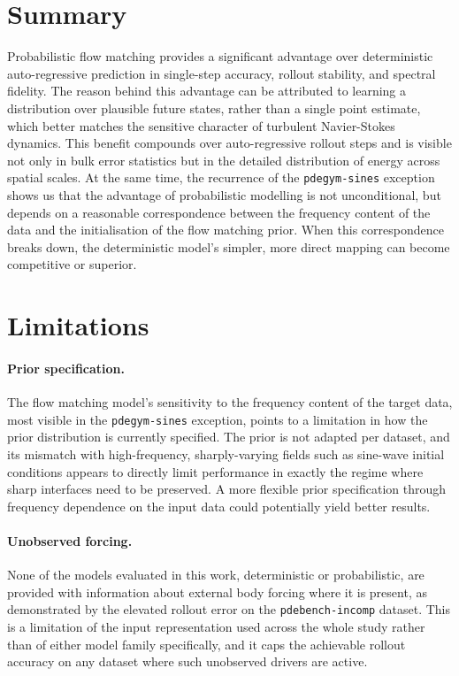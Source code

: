 \section{Summary}

Probabilistic flow matching provides a significant advantage over deterministic auto-regressive prediction in single-step accuracy, rollout stability, and spectral fidelity. The reason behind this advantage can be attributed to learning a distribution over plausible future states, rather than a single point estimate, which better matches the sensitive character of turbulent Navier-Stokes dynamics. This benefit compounds over auto-regressive rollout steps and is visible not only in bulk error statistics but in the detailed distribution of energy across spatial scales. At the same time, the recurrence of the \texttt{pdegym-sines} exception shows us that the advantage of probabilistic modelling is not unconditional, but depends on a reasonable correspondence between the frequency content of the data and the initialisation of the flow matching prior. When this correspondence breaks down, the deterministic model's simpler, more direct mapping can become competitive or superior. 

\section{Limitations}

\paragraph{Prior specification.} The flow matching model's sensitivity to the frequency content of the target data, most visible in the \texttt{pdegym-sines} exception, points to a limitation in how the prior distribution is currently specified. The prior is not adapted per dataset, and its mismatch with high-frequency, sharply-varying fields such as sine-wave initial conditions appears to directly limit performance in exactly the regime where sharp interfaces need to be preserved. A more flexible prior specification through frequency dependence on the input data could potentially yield better results.

\paragraph{Unobserved forcing.} None of the models evaluated in this work, deterministic or probabilistic, are provided with information about external body forcing where it is present, as demonstrated by the elevated rollout error on the \texttt{pdebench-incomp} dataset. This is a limitation of the input representation used across the whole study rather than of either model family specifically, and it caps the achievable rollout accuracy on any dataset where such unobserved drivers are active.

